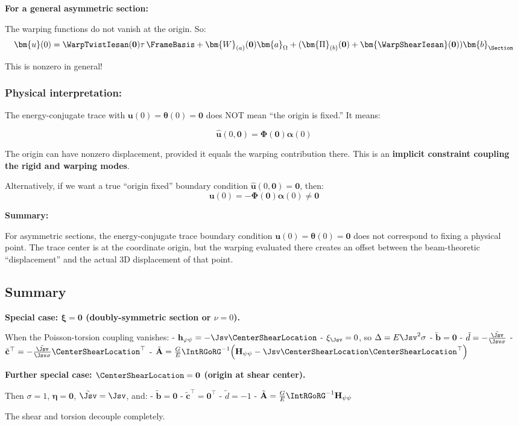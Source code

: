 \textbf{For a general asymmetric section:}

The warping functions do not vanish at the origin. So:
\[\bm{u}(0) = \WarpTwistIesan(\mathbf{0})\tau\,\FrameBasis + \bm{W}_{(a)}(\mathbf{0})\bm{a}_\Omega + (\bm{\Pi}_{(b)}(\mathbf{0}) + \bm{\WarpShearIesan}(\mathbf{0}))\bm{b}_{\Section}\]

This is nonzero in general!

\subsubsection{Physical
interpretation:}\label{physical-interpretation-1}

The energy-conjugate trace with \(\bm{u}(0) = \bm{\theta}(0) = \mathbf{0}\)
does NOT mean ``the origin is fixed.'' It means:

\[\hat{\bm{u}}(0, \mathbf{0}) = \bm{\Phi}(\mathbf{0})\bm{\alpha}(0)\]

The origin can have nonzero displacement, provided it equals the warping
contribution there. This is an \textbf{implicit constraint coupling the
rigid and warping modes}.

Alternatively, if we want a true ``origin fixed'' boundary condition
\(\hat{\bm{u}}(0, \mathbf{0}) = \mathbf{0}\), then:
\[\bm{u}(0) = -\bm{\Phi}(\mathbf{0})\bm{\alpha}(0) \neq \mathbf{0}\]

\textbf{Summary:}

For asymmetric sections, the energy-conjugate trace boundary condition
\(\bm{u}(0) = \bm{\theta}(0) = \mathbf{0}\) does not correspond to fixing a
physical point. The trace center is at the coordinate origin, but the
warping evaluated there creates an offset between the beam-theoretic
``displacement'' and the actual 3D displacement of that point.

\subsection{Summary}


\textbf{Special case: \(\bm{\xi} = \mathbf{0}\) (doubly-symmetric section or
\(\nu = 0\)).}

When the Poisson-torsion coupling vanishes: -
\(\mathbf{h}_{\varphi\psi} = -\Jsv\CenterShearLocation\) -
\(\xi_{\Jsv} = 0\), so \(\Delta = E\Jsv^2\sigma\) -
\(\tilde{\mathbf{b}} = \mathbf{0}\) -
\(\tilde{d} = -\frac{\tilde{\Jsv}}{\Jsv\sigma}\) -
\(\tilde{\mathbf{c}}^\top = -\frac{\tilde{\Jsv}}{\Jsv\sigma}\CenterShearLocation^\top\)
-
\(\tilde{\mathbf{A}} = \frac{G}{E}\IntRGoRG^{-1}\Big(\mathbf{H}_{\psi\psi} - \Jsv\CenterShearLocation\CenterShearLocation^\top\Big)\)

\textbf{Further special case: \(\CenterShearLocation = \mathbf{0}\) (origin
at shear center).}

Then \(\sigma = 1\), \(\bm{\eta} = \mathbf{0}\), \(\tilde{\Jsv} = \Jsv\), and:
- \(\tilde{\mathbf{b}} = \mathbf{0}\) -
\(\tilde{\mathbf{c}}^\top = \mathbf{0}^\top\) - \(\tilde{d} = -1\) -
\(\tilde{\mathbf{A}} = \frac{G}{E}\IntRGoRG^{-1}\mathbf{H}_{\psi\psi}\)

The shear and torsion decouple completely.
